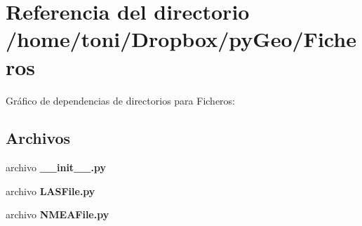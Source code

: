 \section{Referencia del directorio /home/toni/\-Dropbox/py\-Geo/\-Ficheros}
\label{dir_598a923bbf234682817dfe109eb0fd6a}
Gráfico de dependencias de directorios para Ficheros\-:
\subsection*{Archivos}
\begin{DoxyCompactItemize}
\item 
archivo {\bf \-\_\-\-\_\-init\-\_\-\-\_\-.\-py}
\item 
archivo {\bf L\-A\-S\-File.\-py}
\item 
archivo {\bf N\-M\-E\-A\-File.\-py}
\end{DoxyCompactItemize}
